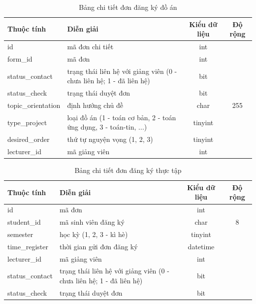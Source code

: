     \begin{table}[h!]
      \centering
      \begin{tabular}{|l|p{}|c|c|}
        \hline
        \textbf{Thuộc tính} & \textbf{Diễn giải} & \textbf{Kiểu dữ liệu} & \textbf{Độ rộng} \\
        \hline
        id & mã đơn chi tiết & int &  \\
        \hline
        form\_id & mã đơn & int & \\
        \hline
        status\_contact & trạng thái liên hệ với giảng viên (0 - chưa liên hệ; 1 - đã liên hệ) & bit & \\
        \hline
        status\_check & trạng thái duyệt đơn & bit & \\
        \hline
        topic\_orientation & định hướng chủ đề & char & 255\\
        \hline
        type\_project & loại đồ án (1 - toán cơ bản, 2 - toán ứng dụng, 3 - toán-tin, ...) & tinyint & \\
        \hline
        desired\_order & thứ tự nguyện vọng (1, 2, 3) & tinyint & \\
        \hline
        lecturer\_id & mã giảng viên & int & \\
        \hline
      \end{tabular}
      \caption{Bảng chi tiết đơn đăng ký đồ án}
    \end{table}

    \begin{table}[h!]
      \centering
      \begin{tabular}{|l|p{}|c|c|}
        \hline
        \textbf{Thuộc tính} & \textbf{Diễn giải} & \textbf{Kiểu dữ liệu} & \textbf{Độ rộng} \\
        \hline
        id & mã đơn & int &  \\
        \hline
        student\_id & mã sinh viên đăng ký & char & 8\\
        \hline
        semester & học kỳ (1, 2, 3 - kì hè) & tinyint & \\
        \hline
        time\_register & thời gian gửi đơn đăng ký & datetime & \\
        \hline
        lecturer\_id & mã giảng viên & int & \\
        \hline
        status\_contact & trạng thái liên hệ với giảng viên (0 - chưa liên hệ; 1 - đã liên hệ) & bit & \\
        \hline
        status\_check & trạng thái duyệt đơn & bit & \\
        \hline
      \end{tabular}
      \caption{Bảng chi tiết đơn đăng ký thực tập}
    \end{table}

